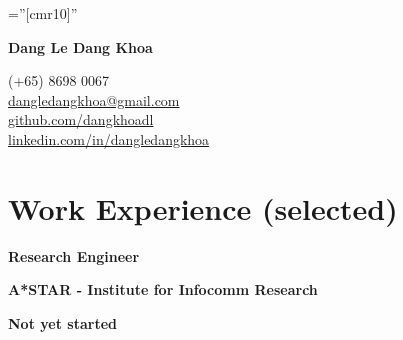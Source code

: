 \documentclass[10pt]{article}
\begin{document}
    \pagestyle{empty}       %
    \font\fb=''[cmr10]''    %

    \begin{multicols}{2}
        \begin{flushleft}
            \textbf{{\Huge Dang Le Dang Khoa }}
        \end{flushleft}

        \columnbreak

        \begin{flushright}
            \textsc (+65) 8698 0067 \\
            \href{mailto:dangledangkhoa@gmail.com}{dangledangkhoa@gmail.com} \\
            \href{https://github.com/dangkhoadl}{github.com/dangkhoadl} \\
            \href{https://sg.linkedin.com/in/dangledangkhoa}{linkedin.com/in/dangledangkhoa}
        \end{flushright}
    \end{multicols}

    \vspace{-5mm}

    \section{Work Experience (selected)}
        \vspace{-5mm}

        \begin{multicols}{3}
            \begin{flushleft}
                \textbf{Research Engineer}
            \end{flushleft}

            \columnbreak

            \begin{center}
                \textbf{A*STAR - Institute for Infocomm Research}
            \end{center}

            \columnbreak

            \begin{flushright}
                \textbf{Not yet started}
            \end{flushright}
        \end{multicols}
\end{document}
